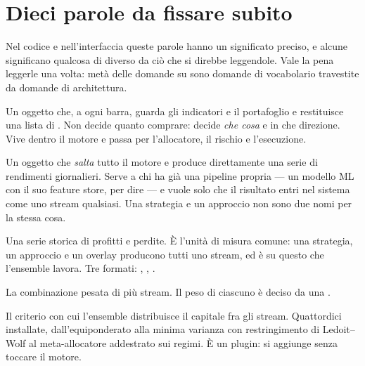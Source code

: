 \section{Dieci parole da fissare subito}\label{sez:vocabolario}

Nel codice e nell'interfaccia queste parole hanno un significato preciso, e
alcune significano qualcosa di diverso da ciò che si direbbe leggendole. Vale
la pena leggerle una volta: metà delle domande su \Lyra{} sono domande di
vocabolario travestite da domande di architettura.

\begin{description}[leftmargin = 0pt, style = nextline, itemsep = 7pt]

\item[\termdef{Strategia} (\pkgStrategie)]
  Un oggetto che, a ogni barra, guarda gli indicatori e il portafoglio e
  restituisce una lista di . Non decide quanto comprare: decide
  \emph{che cosa} e in che direzione. Vive dentro il motore e passa per
  l'allocatore, il rischio e l'esecuzione.

\item[\termdef{Approccio} (\pkgApprocci)]
  Un oggetto che \emph{salta} tutto il motore e produce direttamente una serie
  di rendimenti giornalieri. Serve a chi ha già una pipeline propria --- un
  modello ML con il suo feature store, per dire --- e vuole solo che il
  risultato entri nel sistema come uno stream qualsiasi. Una strategia e un
  approccio non sono due nomi per la stessa cosa.

\item[\termdef{Stream}]
  Una serie storica di profitti e perdite. È l'unità di misura comune: una
  strategia, un approccio e un overlay producono tutti uno stream, ed è su
  questo che l'ensemble lavora. Tre formati: ,
  , .

\item[\termdef{Ensemble}]
  La combinazione pesata di più stream. Il peso di ciascuno è deciso da una
  .

\item[\termdef{Modalità di pesatura} (\pkgPesi)]
  Il criterio con cui l'ensemble distribuisce il capitale fra gli stream.
  Quattordici installate, dall'equiponderato alla minima varianza con
  restringimento di Ledoit--Wolf al meta-allocatore addestrato sui regimi. È
  un plugin: si aggiunge senza toccare il motore.


\end{description}
